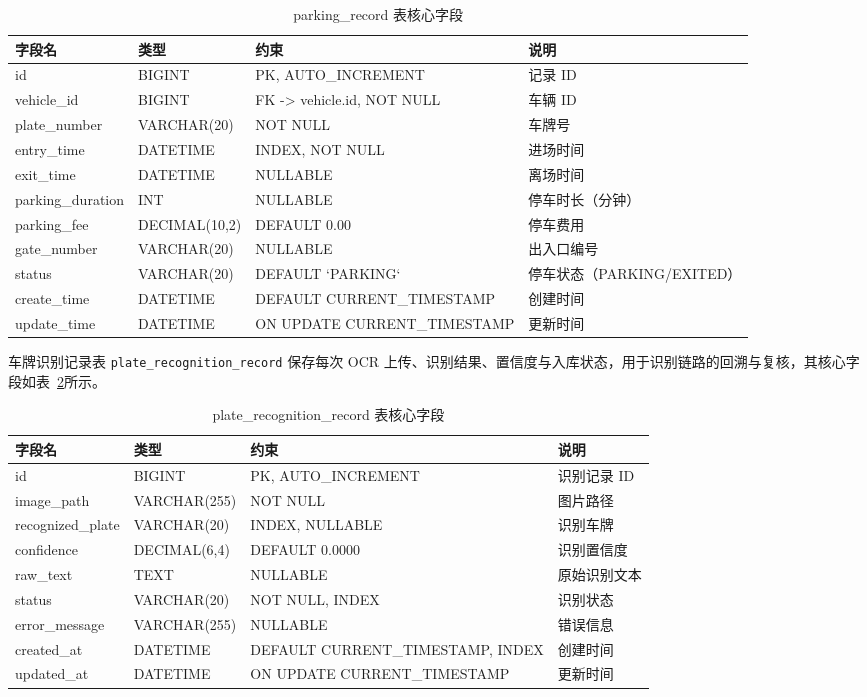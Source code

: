 \documentclass{wzuthesis} %
\begin{document}
\begin{table}[H]
\centering
\footnotesize
\caption{parking\_record 表核心字段}
\label{tab:ddl-parking}
\begin{tabular}{|p{2.2cm}|p{2.2cm}|p{4.0cm}|p{4.5cm}|}
\hline
字段名 & 类型 & 约束 & 说明 \\
\hline
id & BIGINT & PK, AUTO\_INCREMENT & 记录 ID \\
\hline
vehicle\_id & BIGINT & FK -> vehicle.id, NOT NULL & 车辆 ID \\
\hline
plate\_number & VARCHAR(20) & NOT NULL & 车牌号 \\
\hline
entry\_time & DATETIME & INDEX, NOT NULL & 进场时间 \\
\hline
exit\_time & DATETIME & NULLABLE & 离场时间 \\
\hline
parking\_duration & INT & NULLABLE & 停车时长（分钟） \\
\hline
parking\_fee & DECIMAL(10,2) & DEFAULT 0.00 & 停车费用 \\
\hline
gate\_number & VARCHAR(20) & NULLABLE & 出入口编号 \\
\hline
status & VARCHAR(20) & DEFAULT `PARKING` & 停车状态（PARKING/EXITED） \\
\hline
create\_time & DATETIME & DEFAULT CURRENT\_TIMESTAMP & 创建时间 \\
\hline
update\_time & DATETIME & ON UPDATE CURRENT\_TIMESTAMP & 更新时间 \\
\hline
\end{tabular}
\end{table}

车牌识别记录表 \texttt{plate\_recognition\_record} 保存每次 OCR 上传、识别结果、置信度与入库状态，用于识别链路的回溯与复核，其核心字段如表~\ref{tab:ddl-plate}所示。

\begin{table}[H]
\centering
\footnotesize
\caption{plate\_recognition\_record 表核心字段}
\label{tab:ddl-plate}
\begin{tabular}{|p{2.2cm}|p{2.2cm}|p{4.0cm}|p{4.5cm}|}
\hline
字段名 & 类型 & 约束 & 说明 \\
\hline
id & BIGINT & PK, AUTO\_INCREMENT & 识别记录 ID \\
\hline
image\_path & VARCHAR(255) & NOT NULL & 图片路径 \\
\hline
recognized\_plate & VARCHAR(20) & INDEX, NULLABLE & 识别车牌 \\
\hline
confidence & DECIMAL(6,4) & DEFAULT 0.0000 & 识别置信度 \\
\hline
raw\_text & TEXT & NULLABLE & 原始识别文本 \\
\hline
status & VARCHAR(20) & NOT NULL, INDEX & 识别状态 \\
\hline
error\_message & VARCHAR(255) & NULLABLE & 错误信息 \\
\hline
created\_at & DATETIME & DEFAULT CURRENT\_TIMESTAMP, INDEX & 创建时间 \\
\hline
updated\_at & DATETIME & ON UPDATE CURRENT\_TIMESTAMP & 更新时间 \\
\hline
\end{tabular}
\end{table}
\end{document}
